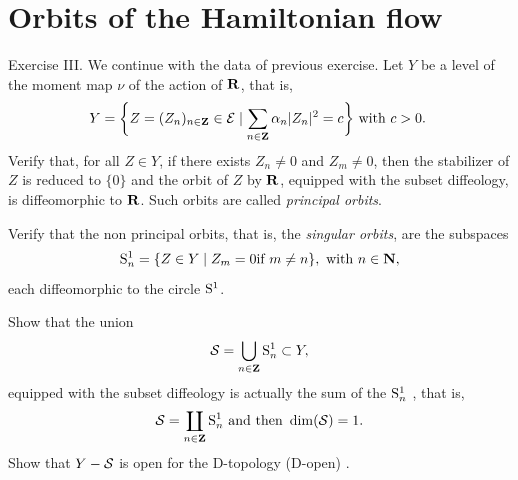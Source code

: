 \section{Orbits of the Hamiltonian flow}

\begin{Article}{Exercise III.}{}
  We continue with the data of previous exercise.
  Let $Y$ be a level of the moment map $\nu$ of the action of $\mathbf{R}$, that is,
  $$
    Y = \bigg\{Z = (Z_n)_{n\in\mathbf{Z}} \in \mathcal{E} \mid \sum_{n\in\mathbf{Z}} \alpha_n \vert Z_n \vert^2 = c \bigg\} \ \text{with $c>0$.}\ 
    $$
   Verify that, for all $Z \in Y$, if there exists $ Z_n \neq 0$ and $ Z_m \neq 0$,
  then the stabilizer of $Z$ is reduced to $\{0\}$ and the orbit of $Z$ by $\mathbf{R}$, equipped with the subset diffeology,
  is diffeomorphic to $\mathbf{R}$. Such orbits are called {\em principal orbits}.
  
    Verify that the non principal orbits, that is, the {\em singular orbits}, are the
  subspaces
  $$
    \mathrm{S}^1_n = \{Z \in Y \mid  Z_m = 0 \mbox{if } m \neq n \}, \ \text{with}\  n\in \mathbf{N},
    $$
  each diffeomorphic to the circle $\mathrm{S}^1$.
  
    Show that the union
  $$
    \mathcal{S} = \bigcup_{n\in\mathbf{Z}} \mathrm{S}^1_n \subset Y,
    $$
  equipped with the subset diffeology is actually the sum of the $\mathrm{S}^1_n$ \cite[\textsection\,1.39]{PIZ13}, that is,
  $$
    \mathcal{S} = \coprod_{n\in\mathbf{Z}} \mathrm{S}^1_n \ \text{and then}\  \dim(\mathcal{S}) = 1.
    $$
    Show that $Y - \mathcal{S}$ is  open for the D-topology (D-open) \cite[\textsection\,2.8]{PIZ13}.
  
\end{Article}


